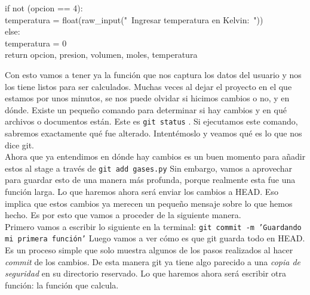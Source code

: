 \documentclass[10pt,letterpaper]{article}
\newcommand{\inlinecode}[1]{
\colorbox{light-gray}{\texttt{#1}}
}
\newenvironment{Code}
{
\begin{lrbox}{\selvestebox}%
\begin{minipage}{\dimexpr\columnwidth-2\fboxsep\relax}
\fontfamily{\ttdefault}\selectfont
}
{\end{minipage}\end{lrbox}%
\begin{center}
\colorbox{light-gray}{\usebox{\selvestebox}}
\end{center}
}
\begin{document}
\begin{Code}
\hspace*{8mm}if not (opcion == 4):\\
\hspace*{16mm}temperatura = float(raw\_input("\ \hspace*{-2mm}Ingresar temperatura en Kelvin:\ "))\\
\hspace*{8mm}else:\\
\hspace*{16mm}temperatura = 0\\
\hspace*{8mm} return opcion, presion, volumen, moles, temperatura
\end{Code}

Con esto vamos a tener ya la funci\'on que nos captura los datos del usuario y nos los tiene listos para ser calculados. Muchas veces al dejar el proyecto en el que estamos por unos minutos, se nos puede olvidar si hicimos cambios o no, y en d\'onde. Existe un peque\~no comando para determinar si hay cambios y en qu\'e archivos o documentos est\'an. Este es \inlinecode{git status}. Si ejecutamos este comando, sabremos exactamente qu\'e fue alterado. Intent\'emoslo y veamos qu\'e es lo que nos dice git.\\

Ahora que ya entendimos en d\'onde hay cambios es un buen momento para a\~nadir estos al stage a trav\'es de \inlinecode{git add gases.py} Sin embargo, vamos a aprovechar para guardar esto de una manera m\'as profunda, porque realmente esta fue una funci\'on larga. Lo que haremos ahora ser\'a enviar los cambios a HEAD. Eso implica que estos cambios ya merecen un peque\~no mensaje sobre lo que hemos hecho. Es por esto que vamos a proceder de la siguiente manera.\\

Primero vamos a escribir lo siguiente en la terminal: \inlinecode{git commit -m 'Guardando mi primera funci\'on'} Luego vamos a ver c\'omo es que git guarda todo en HEAD. Es un proceso simple que solo muestra algunos de los pasos realizados al hacer \emph{commit} de los cambios. De esta manera git ya tiene algo parecido a una \textit{copia de seguridad} en su directorio reservado. Lo que haremos ahora ser\'a escribir otra funci\'on: la funci\'on que calcula.
\end{document}
